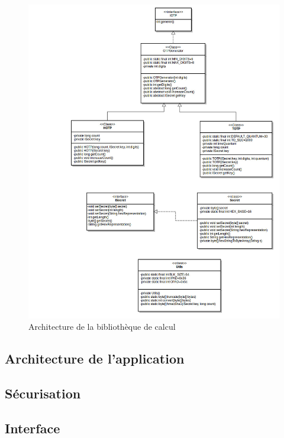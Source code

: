 \begin{figure}
  \centering
  \includegraphics[scale=0.4]{../graphics/uml_lib.jpg}
  \caption{Architecture de la bibliothèque de calcul}
  \label{fig:umlLib}
\end{figure}

\subsection{Architecture de l'application}
\subsection{Sécurisation}
\subsection{Interface}
